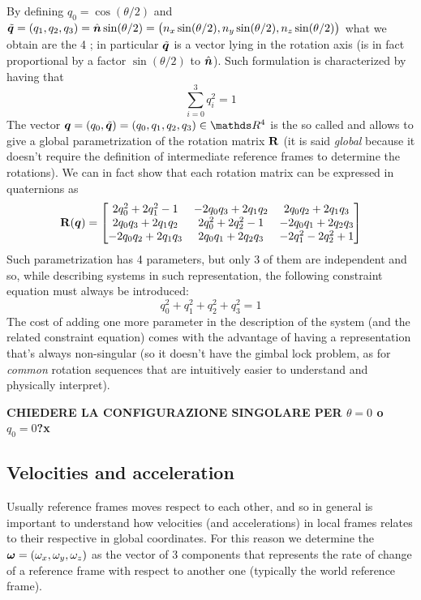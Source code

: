 		By defining $q_0 = \cos(\theta/2)$ and $\tilde{\boldsymbol{q}} = (q_1,q_2,q_3) = \hat{\boldsymbol{n}} \sin(\theta/2) = \big(n_x \sin(\theta/2), n_y\sin(\theta/2), n_z\sin(\theta/2)\big)$ what we obtain are the 4 ; in particular $\tilde{\boldsymbol{q}}$ is a vector lying in the rotation axis (is in fact proportional by a factor $\sin(\theta/2)$ to $\hat{\boldsymbol{n}}$). Such formulation is characterized by having that
		\[ \sum_{i=0}^3 q_i^2 = 1 \]
		The vector $\vett q = (q_0,\tilde{\vett q}) = (q_0, q_1, q_2, q_3) \in \mathds R^4$ is the so called  and allows to give a global parametrization of the rotation matrix $\mathbf{R}$ (it is said \textit{global} because it doesn't require the definition of intermediate reference frames to determine the rotations). We can in fact show that each rotation matrix can be expressed in quaternions as
		\begin{equation} \label{eq:rot:quaternionmatrix}
			\mathbf{R}(\boldsymbol{q}) = \begin{bmatrix}  2q_0^2 + 2 q_1^2 - 1 & - 2q_0 q_3 + 2q_1 q_2 & 2q_0 q_2 + 2q_1 q_3 \\ 2 q_0 q_3 + 2 q_1 q_2 & 2q_0^2 + 2 q_2^2 - 1 & - 2 q_0 q_1 + 2 q_2 q_3 \\ -2q_0q_2 +2 q_1 q_3 & 2 q_0 q_1 +2 q_2q_3 & - 2 q_1^2 -2 q_2^2+1  \end{bmatrix}
		\end{equation}
		Such parametrization has 4 parameters, but only 3 of them are independent and so, while describing systems in such representation, the following constraint equation must always be introduced:
		\[ q_0^2 + q_1^2 + q_2^2 + q_3^2 = 1 \]
		The cost of adding one more parameter in the description of the system (and the related constraint equation) comes with the advantage of having a representation that's always non-singular (so it doesn't have the gimbal lock problem, as for \textit{common} rotation sequences that are intuitively easier to understand and physically interpret). 
		
		\textbf{CHIEDERE LA CONFIGURAZIONE SINGOLARE PER $\theta = 0$ o $q_0 = 0$?x}
		
	\subsection{Velocities and acceleration}
		Usually reference frames moves respect to each other, and so in general is important to understand how velocities (and accelerations) in local frames relates to their respective in global coordinates. For this reason we determine the  $\boldsymbol{\omega} = (\omega_x,\omega_y,\omega_z)$ as the vector of 3 components that represents the rate of change of a reference frame with respect to another one (typically the world reference frame).
		
